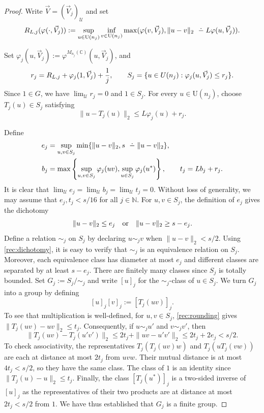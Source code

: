 \documentclass[12pt]{amsart}
\numberwithin{equation}{section}
\theoremstyle{definition}
\newcommand{\C}{\mathbb{C}}
\newcommand{\N}{\mathbb{N}}
\newcommand{\dminus}{ 
\buildrel\textstyle\ .\over{\hbox{ 
\vrule height3pt depth0pt width0pt}{\smash-} 
}}
\def\cal{\mathcal}
\newcommand\cU{{\cal U}}
\begin{document}
\begin{proof}
Write $\vec V=(\vec V_j)_\cU$ and set $$R_{L,j}(\varphi(\cdot,\vec V_j)):=\sup_{u\in \mathrm{U}(n_j)}\inf_{v\in \mathrm{U}(n_j)}\max(\varphi(v,\vec V_j),\|u-v\|_2\dminus L\varphi(u,\vec V_j)).$$ 

Set $\varphi_j(u,\vec V_j):=\varphi^{M_{n_j}(\C)}(u,\vec V_j)$, and 
\[
 r_j=R_{L,j}+\varphi_j(1,\vec V_j)+\frac1j,
 \qquad
 S_j=\{u\in\mathrm \mathrm{U}(n_j):\varphi_j(u,\vec V_j)\leq r_j\}.
\]
Since $1\in G$, we have $\lim_\cU r_j=0$ and $1\in S_j$.  For every 
$u\in\mathrm U(n_j)$, choose $T_j(u)\in S_j$ satisfying
\begin{equation}\label{rec:rounding}
 \|u-T_j(u)\|_2\leq L\varphi_j(u)+r_j.
\end{equation}

Define
\begin{align*}
 e_j&=\sup_{u,v\in S_j}
       \min\{\|u-v\|_2,s\dminus \|u-v\|_2\},\\
 b_j&=\max\left\{
       \sup_{u,v\in S_j}\varphi_j(uv),
       \sup_{u\in S_j}\varphi_j(u^*)\right\},
       \qquad t_j=Lb_j+r_j.
\end{align*}
It is clear that $\lim_\cU e_j=\lim_\cU b_j=\lim_\cU t_j=0$.  Without loss of generality, we may assume that $e_j,t_j<s/16$ for all $j\in \N$.  For $u,v\in S_j$,
the definition of $e_j$ gives the dichotomy
\begin{equation}\label{rec:dichotomy}
 \|u-v\|_2\leq e_j
 \quad\hbox{or}\quad
 \|u-v\|_2\geq s-e_j.
\end{equation}
Define a relation $\sim_j$ on $S_j$ by declaring $u\sim_jv$ when $\|u-v\|_2<s/2$.  Using \ref{rec:dichotomy}, it is easy to verify that $\sim_j$ is an equivalence
relation on $S_j$.  Moreover, each equivalence class has
diameter at most $e_j$ and different classes are separated by
at least $s-e_j$.  There are finitely many classes since $S_j$ is totally bounded.  Set $G_j:=S_j/\sim_j$ and write $[u]_j$ for the $\sim_j$-class of $u\in S_j$.  We turn $G_j$ into a group by defining
\[
 [u]_j[v]_j:=[T_j(uv)]_j.
\]
To see that multiplication is well-defined, for $u,v\in S_j$, \eqref{rec:rounding} gives
$\|T_j(uv)-uv\|_2\leq t_j$.  Consequently, if $u\sim_ju'$ and $v\sim_jv'$,
then
\[
 \|T_j(uv)-T_j(u'v')\|_2
 \leq2t_j+\|uv-u'v'\|_2
 \leq2t_j+2e_j<s/2.
\]
To check associativity,
the representatives
$T_j(T_j(uv)w)$ and $T_j(uT_j(vw))$ are each at distance at most
$2t_j$ from $uvw$.  Their mutual distance is at most
$4t_j<s/2$, so they have the same class.  The class of $1$ is an identity since
$\|T_j(u)-u\|_2\leq t_j$.  Finally, the class $[T_j(u^*)]_j$ is a two-sided
inverse of $[u]_j$ as the representatives of their two products
are at distance at most $2t_j<s/2$ from $1$.  We have thus established that $G_j$ is
a finite group.


\end{proof}
\end{document}
